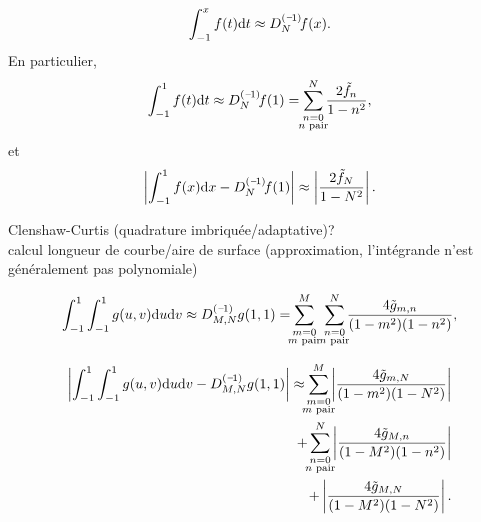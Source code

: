 \begin{equation}
	\int_{-1}^{x} f(t) \dx{t} 
	\approx \interpprim{f}{N}(x).
\end{equation}
En particulier,
\begin{equation}
	\int_{-1}^{1} f(t) \dx{t} 
	\approx 
	\interpprim{f}{N}(1)
	=
	\sum_{\mathclap{\substack{n = 0\\n \text{ pair}}}}^{N} \frac{2 \tilde{f}_n}{1 - n^2},
\end{equation}
et
\begin{equation}
	\left| \int_{-1}^{1} f(x) \dx{x} - \interpprim{f}{N}(1) \right|
	\approx
	\left|\frac{2 \tilde{f}_{N}}{1 - N^2}\right|.
\end{equation}

Clenshaw-Curtis (quadrature imbriquée/adaptative)?\\
calcul longueur de courbe/aire de surface (approximation, l'intégrande n'est généralement pas polynomiale)

\begin{equation}
	\int_{-1}^{1} \int_{-1}^{1} g(u,v) \dx{u} \dx{v}
	\approx 
	\interpprim{\,g}{M,N}(1,1)
	=
	\sum_{\mathclap{\substack{m = 0\\m \text{ pair}}}}^{M}
	\;\;
	\sum_{\mathclap{\substack{n = 0\\n \text{ pair}}}}^{N} 
	\frac{4 \tilde{g}_{m,n}}{(1 - m^2)(1 - n^2)},
\end{equation}

\begin{align}
	\left| \int_{-1}^{1} \int_{-1}^{1} g(u,v) \dx{u}\dx{v} - \interpprim{\,g}{M,N}(1,1) \right|
	\approx
	\sum_{\mathclap{\substack{m = 0\\m \text{ pair}}}}^{M} \left| \frac{4 \tilde{g}_{m,N}}{(1 - m^2)(1 - N^2)} \right| \nonumber\\ + 
	\sum_{\mathclap{\substack{n = 0\\n \text{ pair}}}}^{N} \left| \frac{4 \tilde{g}_{M,n}}{(1 - M^2)(1 - n^2)} \right| \nonumber\\ +
	\left| \frac{4 \tilde{g}_{M,N}}{(1 - M^2)(1 - N^2)} \right|.
\end{align}

